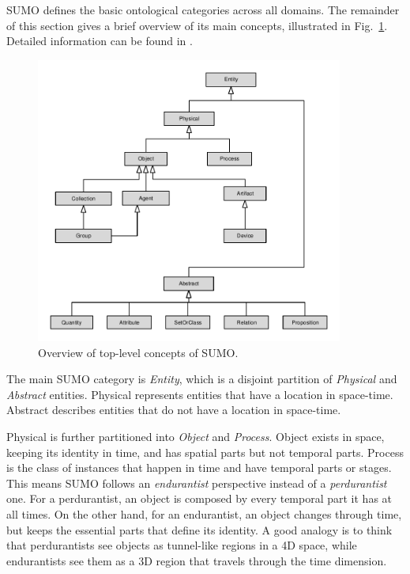\documentclass[preprint,12pt]{elsarticle}
\begin{document}
SUMO defines the  basic ontological categories across all domains. The remainder of this section gives a brief overview of its main concepts, illustrated in Fig.~\ref{fig:sumo}. Detailed information can be found in \cite{SUMO}. 
 
\begin{figure}[th] 
	\centering  
	\includegraphics[width=0.9\textwidth]{figs/sumo}  
	\caption{Overview of top-level concepts of SUMO.}  
	\label{fig:sumo}  
\end{figure}  


The main SUMO category is \emph{Entity}, which is a disjoint partition of \emph{Physical} and \emph{Abstract} entities. Physical represents entities that have a location in space-time. Abstract describes entities that do not have a location in space-time.

Physical is further partitioned into \textit{Object} and \textit{Process}. Object exists in space, keeping its identity in time, and has spatial parts but not temporal parts. Process is the class of instances that happen in time and have temporal parts or stages. This means SUMO follows an \emph{endurantist} perspective instead of a \emph{perdurantist} one. For a perdurantist, an object is composed by every temporal part it has at all times. On the other hand, for an endurantist, an object changes through time, but keeps the essential parts that define its identity. A good analogy is to think that perdurantists see objects as tunnel-like regions in a 4D space, while endurantists see them as a 3D region that travels through the time dimension.
\end{document}
